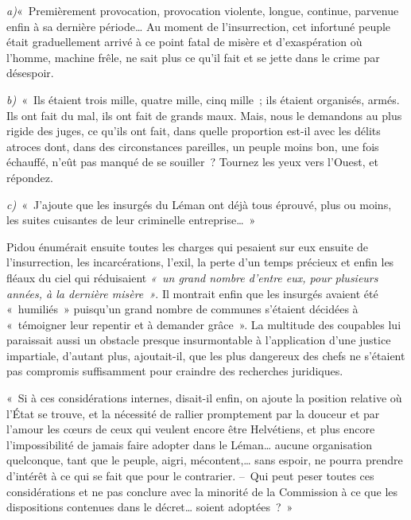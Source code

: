 \documentclass[french,twoside]{book} %
\newenvironment{quoteblock}%
  {\begin{quoting}}
  {\end{quoting}}
\newenvironment{quotebar}{%
    \def\FrameCommand{{\color{rubric!10!}\vrule width 0.5em} \hspace{0.9em}}%
    \def\OuterFrameSep{\itemsep} %
    \MakeFramed {\advance\hsize-\width \FrameRestore}
  }%
  {%
    \endMakeFramed
  }
\renewenvironment{quoteblock}%
  {%
    \savenotes
    \setstretch{0.9}
    \normalfont
    \begin{quotebar}
  }
  {%
    \end{quotebar}
    \spewnotes
  }
\begin{document}
\begin{quoteblock}
 \noindent \emph{a)}« Premièrement provocation, provocation violente, longue, continue, parvenue enfin à sa dernière période… Au moment de l’insurrection, cet infortuné peuple était graduellement arrivé à ce point fatal de misère et d’exaspération où l’homme, machine frêle, ne sait plus ce qu’il fait et se jette dans le crime par désespoir.\par
 \emph{b)} « Ils étaient trois mille, quatre mille, cinq mille ; ils étaient organisés, armés. Ils ont fait du mal, ils ont fait de grands maux. Mais, nous le demandons au plus rigide des juges, ce qu’ils ont fait, dans quelle proportion est-il avec les délits atroces dont, dans des circonstances pareilles, un peuple moins bon, une fois échauffé, n’eût pas manqué de se souiller ? Tournez les yeux vers l’Ouest, et répondez.\par
 \emph{c)} « J’ajoute que les insurgés du Léman ont déjà tous éprouvé, plus ou moins, les suites cuisantes de leur criminelle entreprise… »
 \end{quoteblock}

\noindent Pidou énumérait ensuite toutes les charges qui pesaient sur eux ensuite de l’insurrection, les incarcérations, l’exil, la perte d’un temps précieux et enfin les fléaux du ciel qui réduisaient \emph{« un grand nombre d’entre eux, pour plusieurs années, à la dernière misère »}. Il montrait enfin que les insurgés avaient été « humiliés » puisqu’un grand nombre de communes s’étaient décidées à « témoigner leur repentir et à demander grâce ». La multitude des coupables lui paraissait aussi un obstacle presque insurmontable à l’application d’une justice impartiale, d’autant plus, ajoutait-il, que les plus dangereux des chefs ne s’étaient pas compromis suffisamment pour craindre des recherches juridiques.\par

\begin{quoteblock}
 \noindent « Si à ces considérations internes, disait-il enfin, on ajoute la position relative où l’État se trouve, et la nécessité de rallier promptement par la douceur et par l’amour les cœurs de ceux qui veulent encore être Helvétiens, et plus encore l’impossibilité de jamais faire adopter dans le Léman… aucune organisation quelconque, tant que le peuple, aigri, mécontent,… sans espoir, ne pourra prendre d’intérêt à ce qui se fait que pour le contrarier. – Qui peut peser toutes ces considérations et ne pas conclure avec la minorité de la Commission à ce que les dispositions contenues dans le décret… soient adoptées ? »
 \end{quoteblock}
\end{document}
